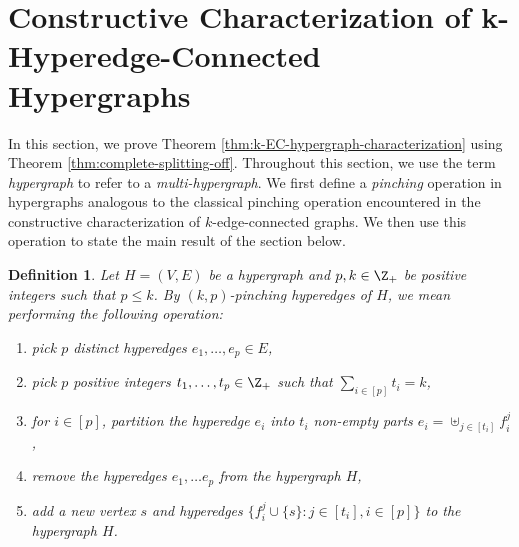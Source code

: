 \documentclass{article}
\def\Cref#1{<#1>}%
\def\({}
\def\){}
\newtheorem{definition}{Definition}[section]
\newcommand{\knote}[1]{{\color{red}[{\tiny Karthik: \bf #1}]\marginpar{\color{red}*}}}
\begin{document}
\section{Constructive Characterization of \(k\)-Hyperedge-Connected Hypergraphs}
\label{sec:characterizing-k-edge-connected-hypergraphs}
In this section, we prove Theorem \ref{thm:k-EC-hypergraph-characterization} using Theorem \ref{thm:complete-splitting-off}. 
Throughout this section, we use the term \emph{hypergraph} to refer to a \emph{multi-hypergraph}.
\iffalse
We first define a \emph{pinching} operation in hypergraphs analogous to the classical pinching operation encountered in the constructive characterization of $k$-edge-connected graphs. We then use this operation to state the main result of the section below.
\begin{definition}
    Let $H = (V, E)$ be a hypergraph and $p,k \in \Z_+$ be positive integers such that $p \leq k$. By \emph{$(k, p)$-pinching} hyperedges of $H$, we mean performing the following operation:
    \begin{enumerate}
        \item pick $p$ distinct hyperedges $e_1, \ldots, e_p \in E$,
        \item pick $p$ positive integers $t_1, \ldots, t_p \in \Z_+$ such that $\sum_{i \in [p]} t_i = k$,
        \item for $i \in [p]$, partition the hyperedge $e_i$ into $t_i$ non-empty parts $e_i = \uplus_{j \in [t_i]} f_i^j$,
        \item remove the hyperedges $e_1, \ldots e_p$ from the hypergraph $H$,
        \item add a new vertex $s$ and hyperedges $\{f_i^j \cup \{s\} : j \in [t_i], i \in [p]\}$ to the hypergraph $H$.
    \end{enumerate}
\end{definition}
\end{document}
